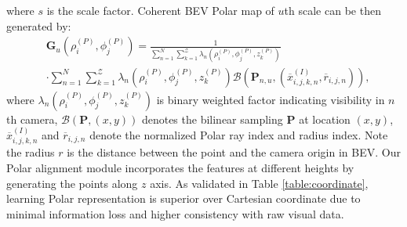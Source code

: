 \documentclass[letterpaper]{article} \usepackage{aaai23}  \usepackage{times}  \usepackage{helvet}  \usepackage{courier}  \usepackage[hyphens]{url}  \usepackage{graphicx} \urlstyle{rm} \def\UrlFont{\rm}  \usepackage{natbib}  \usepackage{caption} \frenchspacing  \setlength{\pdfpagewidth}{8.5in} \setlength{\pdfpageheight}{11in} \usepackage{algorithm}
\begin{document}
where $s$ is the scale factor. Coherent BEV Polar map of $u$th scale can be then generated by:
\begin{equation}
\label{eq:corherent_sampling}
\begin{split}
    &\mathbf{G}_u(\rho^{(P)}_i,\phi^{(P)}_j)
    =\frac{1}{\sum_{n=1}^N\sum_{k=1}^\mathcal{Z} \lambda_n(\rho^{(P)}_i,\phi^{(P)}_j,z^{(P)}_k)} \\ 
    & \cdot \sum_{n=1}^N\sum_{k=1}^\mathcal{Z}\lambda_n(\rho^{(P)}_i,\phi^{(P)}_j,z^{(P)}_k){\mathcal{B}(\mathbf{P}_{n,u},(\overline{x}^{(I)}_{i,j,k,n}, \overline{r}_{i,j,n}))},
\end{split}
\end{equation}
where $\lambda_n(\rho^{(P)}_i,\phi^{(P)}_j,z^{(P)}_k)$ is binary weighted factor indicating visibility in $n$th camera, $\mathcal{B}(\mathbf{P}, (x,y))$ denotes the bilinear sampling $\mathbf{P}$ at location $(x,y)$, $\overline{x}^{(I)}_{i,j,k,n}$ and  $\overline{r}_{i,j,n}$ denote the normalized Polar ray index and radius index. Note the radius $r$ is the distance between the point and the camera origin in BEV. Our Polar alignment module incorporates the features at different heights by generating the points along $z$ axis. 
As validated in Table \ref{table:coordinate}, learning Polar representation is superior over Cartesian coordinate due to  
minimal information loss and higher consistency with raw visual data.
\end{document}
